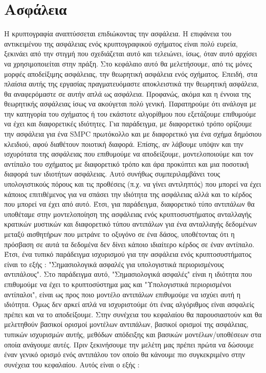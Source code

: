 \chapter{Ασφάλεια}
\label{chapter:security}

Η κρυπτογραφία αναπτύσσεται επιδιώκοντας την ασφάλεια. Η επιφάνεια του αντικειμένου της ασφάλειας ενός κρυπτογραφικού σχήματος είναι πολύ ευρεία, ξεκινάει από την στιγμή που σχεδιάζεται αυτό και τελειώνει, ίσως, όταν αυτό αρχίσει να χρησιμοποιείται στην πράξη. Στο κεφάλαιο αυτό θα μελετήσουμε, από τις μόνες μορφές αποδείξιμης ασφάλειας, την θεωρητική ασφάλεια ενός σχήματος. Επειδή, στα πλαίσια αυτής της εργασίας πραγματευόμαστε αποκλειστικά την θεωρητική ασφάλεια, θα αναφερόμαστε σε αυτήν απλά ως ασφάλεια. Προφανώς, ακόμα και η έννοια της θεωρητικής ασφάλειας ίσως να ακούγεται πολύ γενική. Παρατηρούμε ότι ανάλογα με την κατηγορία του σχήματος ή του εκάστοτε αλγορίθμου που εξετάζουμε επιθυμούμε να έχει και διαφορετικές ιδιότητες. Για παράδειγμα, με  διαφορετικό τρόπο ορίζουμε την ασφάλεια για ένα SMPC πρωτόκολλο και με διαφορετικό για ένα σχήμα δημόσιου κλειδιού, αφού διαθέτουν ποιοτική διαφορά. Επίσης, αν λάβουμε υπόψιν και την ισχυρότατα της ασφάλειας που επιθυμούμε να αποδείξουμε, μοντελοποιούμε και τον αντίπαλο του σχήματος με διαφορετικό τρόπο και άρα προκύπτει και μια ποσοτική διαφορά των ιδιοτήτων ασφάλειας. Αυτό συνήθως συμπεριλαμβάνει τους υπολογιστικούς πόρους και τις προθέσεις (π.χ. να γίνει αντιληπτός) που μπορεί να έχει κάποιος επιτιθέμενος για να σπάσει την ιδιότητα της ασφάλειας αλλά και το κέρδος που μπορεί να έχει από αυτό. Έτσι, για παράδειγμα, διαφορετικό τύπο αντιπάλων θα υποθέταμε στην μοντελοποίηση της ασφάλειας ενός κρυπτοσυστήματος ανταλλαγής κρατικών μυστικών και διαφορετικό τύπου αντιπάλων για ένα ανταλλαγής δεδομένων μεταξύ αισθητήρων που μετράνε το οξυγόνο σε ένα δάσος, υποθέτοντας ότι η πρόσβαση σε αυτά τα δεδομένα δεν δίνει κάποιο ιδιαίτερο κέρδος σε έναν αντίπαλο. Έτσι, ένα τυπικό παράδειγμα ισχυρισμού για την ασφάλεια ενός κρυπτοσυστήματος είναι το εξής :
"Σημασιολογικά ασφαλές για υπολογιστικά περιορισμένους αντιπάλους". Στο παράδειγμα αυτό, "Σημασιολογικά ασφαλές" είναι η ιδιότητα που επιθυμούμε να έχει το κρυπτοσύστημα μας και "Υπολογιστικά περιορισμένοι αντίπαλοι", είναι ως προς ποιο μοντέλο αντιπάλων επιθυμούμε να ισχύει αυτή η ιδιότητα. Όμως δεν αρκεί απλά να ισχυριστούμε ότι ένας αλγόριθμος είναι ασφαλείς πρέπει και να το αποδείξουμε. Στην συνέχεια του κεφαλαίου θα παρουσιαστούν και θα μελετηθούν βασικοί ορισμοί μοντέλων αντιπάλων, βασικοί ορισμοί της ασφάλειας, τυπικών ισχυρισμών αυτής, μεθόδων απόδειξης και βασικών μοντέλων/υποθέσεων στα οποία ανάγουμε αυτές. Πριν ξεκινήσουμε την μελέτη μας πρέπει πρώτα να δώσουμε έναν γενικό ορισμό ενός αντιπάλου τον οποίο θα κάνουμε πιο συγκεκριμένο στην συνέχεια του κεφαλαίου. Αυτός είναι ο εξής :

